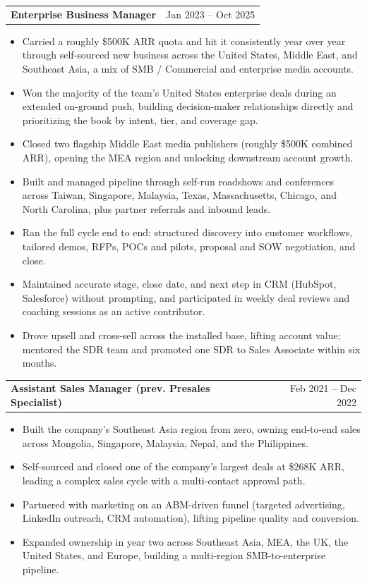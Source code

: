 \documentclass[10pt, letterpaper]{article}
\makeatletter
\newcommand{\roleheader}[2]{%
  \vspace{2pt}\noindent
  \begin{tabularx}{\textwidth}{@{}X r@{}}
    {\bfseries\color{darkgray} #1} & {\color{lightgray}\small #2}
  \end{tabularx}
  \vspace{1pt}
}
\makeatother
\begin{document}
\roleheader{Enterprise Business Manager}{Jan 2023 -- Oct 2025}
\begin{itemize}
  \item Carried a roughly \$500K ARR quota and hit it consistently year over year through self-sourced new business across the United States, Middle East, and Southeast Asia, a mix of SMB / Commercial and enterprise media accounts.
  \item Won the majority of the team's United States enterprise deals during an extended on-ground push, building decision-maker relationships directly and prioritizing the book by intent, tier, and coverage gap.
  \item Closed two flagship Middle East media publishers (roughly \$500K combined ARR), opening the MEA region and unlocking downstream account growth.
  \item Built and managed pipeline through self-run roadshows and conferences across Taiwan, Singapore, Malaysia, Texas, Massachusetts, Chicago, and North Carolina, plus partner referrals and inbound leads.
  \item Ran the full cycle end to end: structured discovery into customer workflows, tailored demos, RFPs, POCs and pilots, proposal and SOW negotiation, and close.
  \item Maintained accurate stage, close date, and next step in CRM (HubSpot, Salesforce) without prompting, and participated in weekly deal reviews and coaching sessions as an active contributor.
  \item Drove upsell and cross-sell across the installed base, lifting account value; mentored the SDR team and promoted one SDR to Sales Associate within six months.
\end{itemize}

\roleheader{Assistant Sales Manager (prev. Presales Specialist)}{Feb 2021 -- Dec 2022}
\begin{itemize}
  \item Built the company's Southeast Asia region from zero, owning end-to-end sales across Mongolia, Singapore, Malaysia, Nepal, and the Philippines.
  \item Self-sourced and closed one of the company's largest deals at \$268K ARR, leading a complex sales cycle with a multi-contact approval path.
  \item Partnered with marketing on an ABM-driven funnel (targeted advertising, LinkedIn outreach, CRM automation), lifting pipeline quality and conversion.
  \item Expanded ownership in year two across Southeast Asia, MEA, the UK, the United States, and Europe, building a multi-region SMB-to-enterprise pipeline.
\end{itemize}
\end{document}

